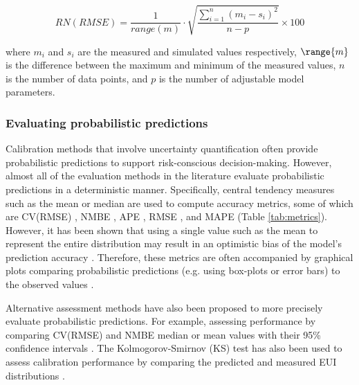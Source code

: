 \documentclass[review]{elsarticle}
\begin{document}
\begin{equation}\label{eq:rnrmse}
RN(RMSE) = \frac{1}{range(m)}\cdot \sqrt{\frac{\sum_{i=1}^n (m_i - s_i)^2}{n-p}} \times 100
\end{equation}

\noindent where $m_i$ and $s_i$ are the measured and simulated values respectively, $\range{m}$ is the difference between the maximum and minimum of the measured values, $n$ is the number of data points, and $p$ is the number of adjustable model parameters.

\subsubsection{Evaluating probabilistic predictions}

Calibration methods that involve uncertainty quantification often provide probabilistic predictions to support risk-conscious decision-making. However, almost all of the evaluation methods in the literature evaluate probabilistic predictions in a deterministic manner. Specifically, central tendency measures such as the mean or median are used to compute accuracy metrics, some of which are CV(RMSE) \cite{lim2018influences, chong2018guidelines, lim2017comprehensive, chong2017bayesian, yuan2017simultaneous, sokol2017validation, kim2016stepwise, heo2015evaluation, wang2020bayesian, kristensen2020long}, NMBE \cite{chong2018guidelines, chong2017bayesian, kim2016stepwise, kristensen2020long}, APE \cite{cerezo2017comparison, yuan2017simultaneous, sokol2017validation, wang2020bayesian}, RMSE \cite{lim2017comprehensive, heo2015evaluation, tardioli2020methodology}, and MAPE \cite{tardioli2020methodology} (Table \ref{tab:metrics}). However, it has been shown that using a single value such as the mean to represent the entire distribution may result in an optimistic bias of the model's prediction accuracy \cite{chong2019continuous}. Therefore, these metrics are often accompanied by graphical plots comparing probabilistic predictions (e.g. using box-plots or error bars) to the observed values \cite{chong2018guidelines, kristensen2018hierarchical, yuan2017simultaneous, heo2015evaluation, kristensen2020long}. 

Alternative assessment methods have also been proposed to more precisely evaluate probabilistic predictions. For example, assessing performance by comparing CV(RMSE) and NMBE median or mean values with their 95\% confidence intervals \cite{kristensen2018hierarchical, nagpal2019framework, zhu2020uncertainty}. The Kolmogorov-Smirnov (KS) test has also been used to assess calibration performance by comparing the predicted and measured EUI distributions \cite{cerezo2017comparison, sokol2017validation}.
\end{document}
